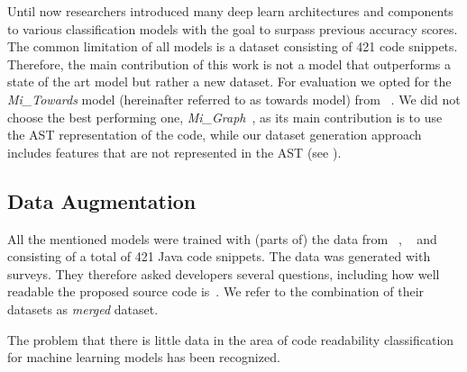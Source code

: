\documentclass[%
class=scrreprt,
chapterprefix=false,%
open=right,%
twoside=false,%
paper=a4,%
logofile={Logo\_zentral\_farbig\_EN.png},%
thesistype=master,%
UKenglish,%
]{se2thesis}
\theoremstyle{definition}
\newcommand{\numMerged}{421\xspace}
\begin{document}

	
	Until now researchers introduced many deep learn architectures and components to various classification models with the goal to surpass previous accuracy scores. The common limitation of all models is a dataset consisting of \numMerged code snippets. %
	Therefore, the main contribution of this work is not a model that outperforms a state of the art model but rather a new dataset. For evaluation we opted for the \textit{Mi\_Towards} model (hereinafter referred to as towards model) from \citeauthor{mi2022towards}~\cite{mi2022towards}. We did not choose the best performing one, \textit{Mi\_Graph}~\cite{mi2023graph}, as its main contribution is to use the AST representation of the code, while our dataset generation approach includes features that are not represented in the AST (see ).
			
\subsection{Data Augmentation} \label{Data Augmentation}

	All the mentioned models were trained with (parts of) the data from \citeauthor{buse2009learning}~\cite{buse2009learning}, \citeauthor{dorn2012general}~\cite{dorn2012general} and \citeauthor{scalabrino2018comprehensive}~\cite{scalabrino2018comprehensive} consisting of a total of \numMerged Java code snippets. The data was generated with surveys. They therefore asked developers several questions, including how well readable the proposed source code is~\cite{buse2009learning, dorn2012general, scalabrino2018comprehensive}. We refer to the combination of their datasets as \textit{merged} dataset.
	
	The problem that there is little data in the area of code readability classification for machine learning models has been recognized.
					
\end{document}

